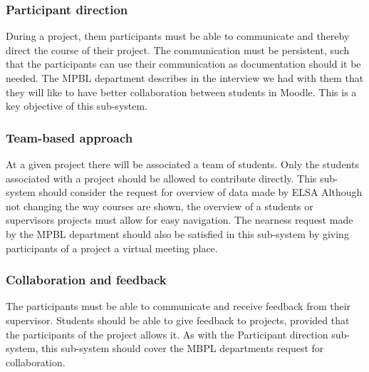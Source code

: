 \subsubsection{Participant direction}
During a project, them participants must be able to communicate and thereby direct the course of their project.
The communication must be persistent, such that the participants can use their communication as documentation should it be needed.
The MPBL department describes in the interview we had with them that they will like to have better collaboration between students in Moodle.
This is a key objective of this sub-system.

\subsubsection{Team-based approach}
At a given project there will be associated a team of students.
Only the students associated with a project should be allowed to contribute directly.
This sub-system should consider the request for overview of data made by ELSA
Although not changing the way courses are shown, the overview of a students or supervisors projects must allow for easy navigation.
The nearness request made by the MPBL department should also be satisfied in this sub-system by giving participants of a project a virtual meeting place.

\subsubsection{Collaboration and feedback}
The participants must be able to communicate and receive feedback from their supervisor.
Students should be able to give feedback to projects, provided that the participants of the project allows it.
As with the Participant direction sub-system, this sub-system should cover the MBPL departments request for collaboration.










